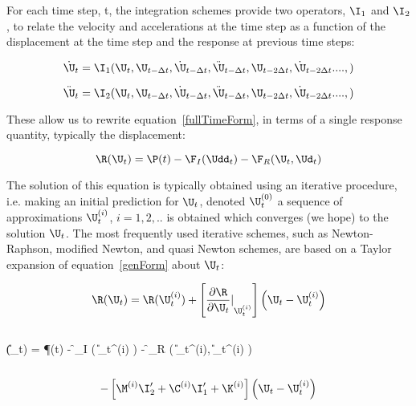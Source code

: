 For each time step, t, the integration schemes provide two operators,
$\I_1$ and $\I_2$, to relate the velocity and accelerations at the 
time step as a function of the displacement at the time step and the
response at previous time steps: 

\begin{equation} 
\dot \U_{t} = {\I}_1 (\U_t, \U_{t-\Delta t}, \dot \U_{t-\Delta t},
\ddot \U_{t - \Delta t}, \U_{t - 2\Delta t}, \dot \U_{t - 2 \Delta t}. ..., )
\label{I1}
\end{equation} 

\begin{equation} 
\ddot \U_{t} = {\I}_2 (\U_t, \U_{t-\Delta t}, \dot \U_{t-\Delta t},
\ddot \U_{t - \Delta t}, \U_{t - 2\Delta t}, \dot \U_{t - 2 \Delta t}. ..., )
\label{I2}
\end{equation} 

These allow us to rewrite equation~\ref{fullTimeForm}, in terms of a
single response quantity, typically the displacement:

\begin{equation}
\R(\U_t) = \P(t) - \F_I(\Udd_t) - \F_R(\U_t, \Ud_t)
\label{genForm}
\end{equation}

The solution of this equation is typically obtained using an iterative
procedure, i.e. making an initial prediction for $\U_{t}$,
denoted $\U_{t}^{(0)}$ a sequence of approximations $\U_{t}^{(i)}$,
$i=1,2, ..$ is obtained which converges (we hope) to the solution $\U_{t}$. The
most frequently used iterative schemes, such as Newton-Raphson,
modified Newton, and quasi Newton schemes, are based on a Taylor
expansion of equation~\ref{genForm} about $\U_{t}$:    

\begin{equation} 
\R(\U_{t}) = 
\R(\U_{t}^{(i)}) +
\left[ {\frac{\partial \R}{\partial \U_t} \vert}_{\U_{t}^{(i)}}\right]
\left( \U_{t} - \U_{t}^{(i)} \right) 
\end{equation}


$$

$$

\R(\U_{t}) = 
 \P (t) 
 - \f_{I} \left( \ddot \U_{t}^{(i)} \right) -
\f_{R} \left( \dot \U_{t}^{(i)}, \U_{t}^{(i)} \right)

$$

$$

\begin{equation} 
- \left[
   \M^{(i)} {\I}_2'
+  \C^{(i)} {\I}_1'
+ \K^{(i)}  \right]
 \left( \U_{t} - \U_{t}^{(i)} \right)
\label{femGenFormTaylor}
\end{equation} 

